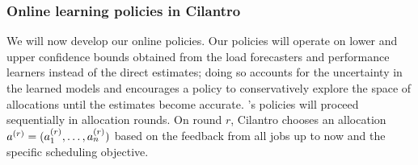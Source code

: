 





\subsubsection{Online learning policies in Cilantro}
\label{sec:learningpolicies}


We will now develop our online policies.
Our policies will  operate on lower and upper confidence bounds obtained from the
load forecasters and performance learners instead of the direct
estimates;
doing so accounts for the uncertainty in the learned models and encourages a policy to
conservatively explore the space of allocations until the estimates become accurate.
% 
\cilantro's policies will proceed sequentially in allocation rounds.
On round $r$, Cilantro chooses an allocation 
$a^{(r)}= (a_{1}^{(r)},\dots,a_{n}^{(r)})$
based on the feedback from all jobs up to now and the specific scheduling objective.

% 

